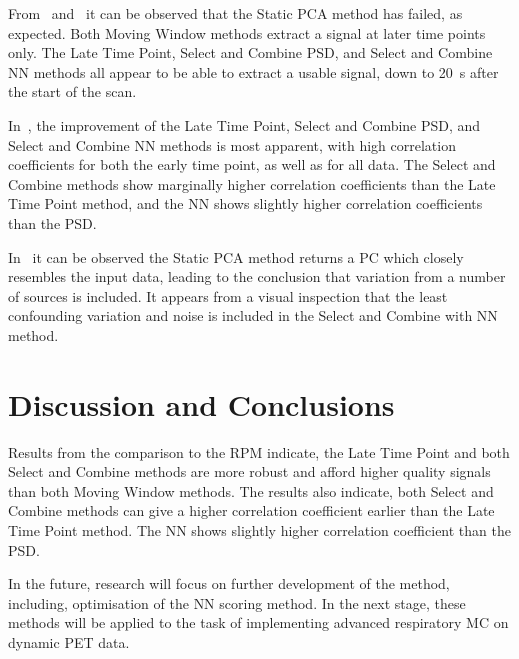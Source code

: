     From~ and~ it can be observed that the Static \acrshort{PCA} method has failed, as expected. Both Moving Window methods extract a signal at later time points only. The Late Time Point, Select and Combine \gls{PSD}, and Select and Combine \gls{NN} methods all appear to be able to extract a usable signal, down to \SI{20}{\second} after the start of the scan.
    
    In~, the improvement of the Late Time Point, Select and Combine \gls{PSD}, and Select and Combine \gls{NN} methods is most apparent, with high correlation coefficients for both the early time point, as well as for all data. The Select and Combine methods show marginally higher correlation coefficients than the Late Time Point method, and the \gls{NN} shows slightly higher correlation coefficients than the \gls{PSD}.
    
    In~ it can be observed the Static \acrshort{PCA} method returns a \gls{PC} which closely resembles the input data, leading to the conclusion that variation from a number of sources is included. It appears from a visual inspection that the least confounding variation and noise is included in the Select and Combine with \gls{NN} method.


\section{Discussion and Conclusions} \label{sec:discussion_and_conclusions}
    Results from the comparison to the \gls{RPM} indicate, the Late Time Point and both Select and Combine methods are more robust and afford higher quality signals than both Moving Window methods. The results also indicate, both Select and Combine methods can give a higher correlation coefficient earlier than the Late Time Point method. The \gls{NN} shows slightly higher correlation coefficient than the \gls{PSD}.
    
    In the future, research will focus on further development of the method, including, optimisation of the \gls{NN} scoring method. In the next stage, these methods will be applied to the task of implementing advanced respiratory \acrlong{MC} on dynamic \acrshort{PET} data.